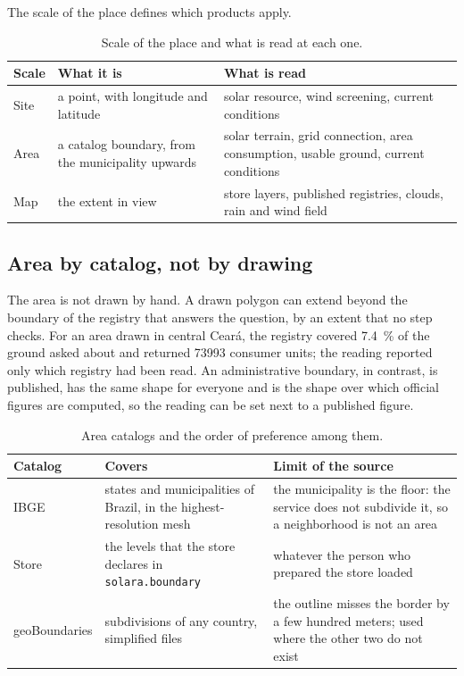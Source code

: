 \documentclass[10pt,a4paper,oneside]{article}
\begin{document}
The scale of the place defines which products apply.

\begin{table}[H]
\caption{Scale of the place and what is read at each one.}
\begin{tabularx}{\linewidth}{l Y Y}
\toprule
\textbf{Scale} & \textbf{What it is} & \textbf{What is read} \\
\midrule
Site & a point, with longitude and latitude & solar resource, wind screening,
  current conditions \\
Area & a catalog boundary, from the municipality upwards & solar terrain,
  grid connection, area consumption, usable ground, current conditions \\
Map & the extent in view & store layers, published registries, clouds, rain
  and wind field \\
\bottomrule
\end{tabularx}
\end{table}

\subsection{Area by catalog, not by drawing}
\label{sec:catalogo}

The area is not drawn by hand. A drawn polygon can extend beyond the boundary
of the registry that answers the question, by an extent that no step checks.
For an area drawn in central Ceará, the registry covered
\qty{7.4}{\percent} of the ground asked about and returned \num{73993}
consumer units; the reading reported only which registry had been read. An
administrative boundary, in contrast, is published, has the same shape for
everyone and is the shape over which official figures are computed, so the
reading can be set next to a published figure.

\begin{table}[H]
\caption{Area catalogs and the order of preference among them.}
\begin{tabularx}{\linewidth}{l Y Y}
\toprule
\textbf{Catalog} & \textbf{Covers} & \textbf{Limit of the source} \\
\midrule
IBGE & states and municipalities of Brazil, in the highest-resolution mesh &
  the municipality is the floor: the service does not subdivide it, so a
  neighborhood is not an area \\
Store & the levels that the store declares in \texttt{solara.boundary} &
  whatever the person who prepared the store loaded \\
geoBoundaries & subdivisions of any country, simplified files & the outline
  misses the border by a few hundred meters; used where the other two do not
  exist \\
\bottomrule
\end{tabularx}
\end{table}
\end{document}
